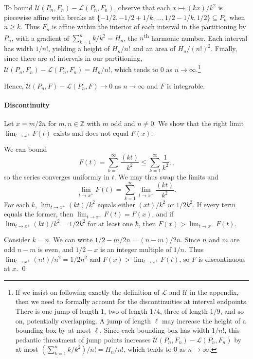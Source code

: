 \documentclass[oneside]{article}
\newcommand\bbZ{\mathbb{Z}}
\newcommand\calL{\mathcal{L}}
\newcommand\calU{\mathcal{U}}
\begin{document}
\begin{enumerate}[label=(\alph*)]
    To bound $\calU(P_n, F_n) - \calL(P_n, F_n)$, observe that each $x \mapsto (kx)/k^2$ is piecewise affine with breaks at $\{-1/2, -1/2 + 1/k, \dots, 1/2-1/k, 1/2\} \subseteq P_n$ when $n \geq k$. Thus $F_n$ is affine within the interior of each interval in the partitioning by $P_n$, with a gradient of $\sum_{k=1}^n k/k^2 = H_n$, the $n$\textsuperscript{th} harmonic number. Each interval has width $1/n!$, yielding a height of $H_n/n!$ and an area of $H_n/(n!)^2$. Finally, since there are $n!$ intervals in our partitioning, $\calU(P_n, F_n) - \calL(P_n, F_n) = H_n/n!$, which tends to $0$ as $n \to \infty$.\footnote{If we insist on following exactly the definition of $\calL$ and $\calU$ in the appendix, then we need to formally account for the discontinuities at interval endpoints. There is one jump of length $1$, two of length $1/4$, three of length $1/9$, and so on, potentially overlapping. A jump of length $\ell$ may increase the height of a bounding box by at most $\ell$. Since each bounding box has width $1/n!$, this pedantic threatment of jump points increases $\calU(P_n, F_n) - \calL(P_n, F_n)$ by at most $(\sum_{k=1}^n k/k^2)/n! = H_n/n!$, which tends to $0$ as $n\to \infty$.}

    Hence, $\calU(P_n, F) - \calL(P_n, F) \to 0$ as $n\to\infty$ and $F$ is integrable.

    \paragraph{Discontinuity} Let $x = m/2n$ for $m, n \in \bbZ$ with $m$ odd and $n \neq 0$. We show that the right limit $\lim_{t\to x^+}F(t)$ exists and does not equal $F(x)$.

    We can bound \[
      F(t) = \sum_{k=1}^\infty \frac{(kt)}{k^2} \leq \sum_{k=1}^\infty \frac{1}{k^2}, \text{,}
    \] so the series converges uniformly in $t$. We may thus swap the limits and \[
      \lim_{t\to x^+}F(t) = \sum_{k=1}^\infty \lim_{t\to x^+} \frac{(kt)}{k^2} \text{.}
    \] For each $k$, $\lim_{t\to x^+} (kt)/k^2$ equals either $(xt)/k^2$ or $1/2k^2$. If every term equals the former, then $\lim_{t\to x^+}F(t) = F(x)$, and if $\lim_{t\to x^+} (kt)/k^2 = 1/2k^2$ for at least one $k$, then $F(x) > \lim_{t\to x^+}F(t)$.

    Consider $k = n$. We can write $1/2 - m/2n = (n - m)/2n$. Since $n$ and $m$ are odd $n - m$ is even, and $1/2 - x$ is an integer multiple of $1/n$. Thus $\lim_{t\to x^+} (nt)/n^2 = 1/2n^2$ and $F(x) > \lim_{t\to x^+}F(t)$, so $F$ is discontinuous at $x$. \qed
  \end{enumerate}
\end{document}

